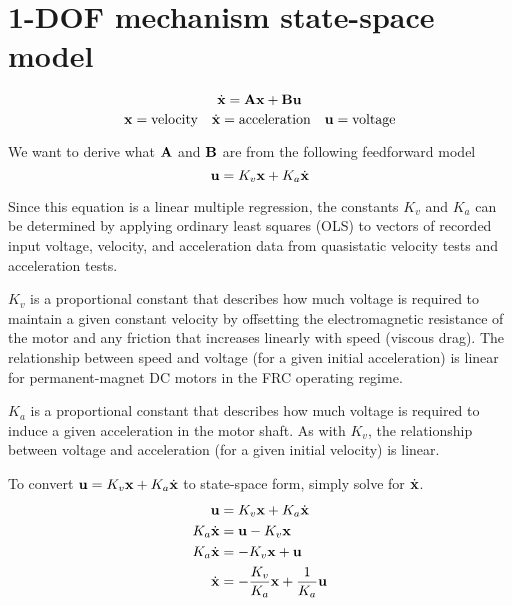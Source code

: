 \section{1-DOF mechanism state-space model}
\begin{equation*}
  \dot{\mathbf{x}} = \mathbf{A}\mathbf{x} + \mathbf{B}\mathbf{u}
\end{equation*}
\begin{equation*}
  \mathbf{x} = \text{velocity}
  \quad
  \dot{\mathbf{x}} = \text{acceleration}
  \quad
  \mathbf{u} = \text{voltage}
\end{equation*}

We want to derive what $\mathbf{A}$ and $\mathbf{B}$ are from the following
feedforward model
\begin{equation*}
  \mathbf{u} = K_v \mathbf{x} + K_a \dot{\mathbf{x}}
\end{equation*}

Since this equation is a linear multiple regression, the constants $K_v$ and
$K_a$ can be determined by applying ordinary least squares (OLS) to vectors of
recorded input voltage, velocity, and acceleration data from quasistatic
velocity tests and acceleration tests.

$K_v$ is a proportional constant that describes how much voltage is required to
maintain a given constant velocity by offsetting the electromagnetic resistance
of the motor and any friction that increases linearly with speed (viscous drag).
The relationship between speed and voltage (for a given initial acceleration) is
linear for permanent-magnet DC motors in the FRC operating regime.

$K_a$ is a proportional constant that describes how much voltage is required to
induce a given acceleration in the motor shaft. As with $K_v$, the relationship
between voltage and acceleration (for a given initial velocity) is linear.

To convert $\mathbf{u} = K_v \mathbf{x} + K_a \dot{\mathbf{x}}$ to state-space form,
simply solve for $\dot{\mathbf{x}}$.
\begin{align*}
  \mathbf{u} &= K_v \mathbf{x} + K_a \dot{\mathbf{x}} \\
  K_a \dot{\mathbf{x}} &= \mathbf{u} - K_v \mathbf{x} \\
  K_a \dot{\mathbf{x}} &= -K_v \mathbf{x} + \mathbf{u} \\
  \dot{\mathbf{x}} &= -\frac{K_v}{K_a} \mathbf{x} + \frac{1}{K_a} \mathbf{u}
\end{align*}

